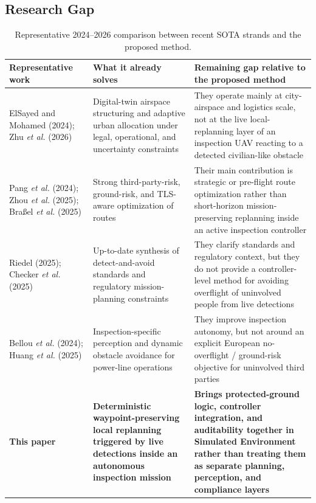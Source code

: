 \documentclass[journal,twoside,web]{ieeecolor}
\begin{document}
\subsection{Research Gap}

\begin{table}[t]
    \centering
    \footnotesize
    \begin{tabular}{@{}p{} p{} p{}@{}}
        \toprule
        \textbf{Representative work} & \textbf{What it already solves} & \textbf{Remaining gap relative to the proposed method} \\
        \midrule
        ElSayed and Mohamed (2024); Zhu \emph{et al.} (2026) \cite{elsayed2024digitaltwin,zhu2026adaptive}
        & Digital-twin airspace structuring and adaptive urban allocation under legal, operational, and uncertainty constraints
        & They operate mainly at city-airspace and logistics scale, not at the live local-replanning layer of an inspection UAV reacting to a detected civilian-like obstacle \\

        Pang \emph{et al.} (2024); Zhou \emph{et al.} (2025); Bra{\ss}el \emph{et al.} (2025) \cite{pang2024stochastic,zhou2025riskbased,brassel2025riskaware}
        & Strong third-party-risk, ground-risk, and TLS-aware optimization of routes
        & Their main contribution is strategic or pre-flight route optimization rather than short-horizon mission-preserving replanning inside an active inspection controller \\

        Riedel (2025); Checker \emph{et al.} (2025) \cite{riedel2025daa,checker2025regulatory}
        & Up-to-date synthesis of detect-and-avoid standards and regulatory mission-planning constraints
        & They clarify standards and regulatory context, but they do not provide a controller-level method for avoiding overflight of uninvolved people from live detections \\

        Bellou \emph{et al.} (2024); Huang \emph{et al.} (2025) \cite{bellou2024aerial,huang2025hybrid}
        & Inspection-specific perception and dynamic obstacle avoidance for power-line operations
        & They improve inspection autonomy, but not around an explicit European no-overflight / ground-risk objective for uninvolved third parties \\

        \textbf{This paper}
        & \textbf{Deterministic waypoint-preserving local replanning triggered by live detections inside an autonomous inspection mission}
        & \textbf{Brings protected-ground logic, controller integration, and auditability together in Simulated Environment rather than treating them as separate planning, perception, and compliance layers} \\
        \bottomrule
    \end{tabular}
    \caption{Representative 2024--2026 comparison between recent SOTA strands and the proposed method.}
    \label{tab:sota_positioning}
\end{table}
\end{document}

